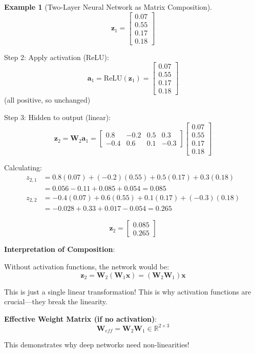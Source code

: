 \documentclass[12pt,a4paper]{article}
\theoremstyle{definition}
\newtheorem{example}{Example}[section]
\begin{document}
\begin{example}[Two-Layer Neural Network as Matrix Composition]
\[
\mathbf{z}_1 = \begin{bmatrix}
0.07 \\ 0.55 \\ 0.17 \\ 0.18
\end{bmatrix}
\]

Step 2: Apply activation (ReLU):
\[
\mathbf{a}_1 = \text{ReLU}(\mathbf{z}_1) = \begin{bmatrix}
0.07 \\ 0.55 \\ 0.17 \\ 0.18
\end{bmatrix}
\]
(all positive, so unchanged)

Step 3: Hidden to output (linear):
\[
\mathbf{z}_2 = \mathbf{W}_2\mathbf{a}_1 = \begin{bmatrix}
0.8 & -0.2 & 0.5 & 0.3 \\
-0.4 & 0.6 & 0.1 & -0.3
\end{bmatrix}
\begin{bmatrix}
0.07 \\ 0.55 \\ 0.17 \\ 0.18
\end{bmatrix}
\]

Calculating:
\begin{align*}
z_{2,1} &= 0.8(0.07) + (-0.2)(0.55) + 0.5(0.17) + 0.3(0.18) \\
&= 0.056 - 0.11 + 0.085 + 0.054 = 0.085 \\
z_{2,2} &= -0.4(0.07) + 0.6(0.55) + 0.1(0.17) + (-0.3)(0.18) \\
&= -0.028 + 0.33 + 0.017 - 0.054 = 0.265
\end{align*}

\[
\mathbf{z}_2 = \begin{bmatrix}
0.085 \\ 0.265
\end{bmatrix}
\]

\textbf{Interpretation of Composition}:

Without activation functions, the network would be:
\[
\mathbf{z}_2 = \mathbf{W}_2(\mathbf{W}_1\mathbf{x}) = (\mathbf{W}_2\mathbf{W}_1)\mathbf{x}
\]

This is just a single linear transformation! This is why activation functions are crucial—they break the linearity.

\textbf{Effective Weight Matrix (if no activation)}:
\[
\mathbf{W}_{eff} = \mathbf{W}_2\mathbf{W}_1 \in \mathbb{R}^{2 \times 3}
\]

This demonstrates why deep networks need non-linearities!
\end{example}
\end{document}
